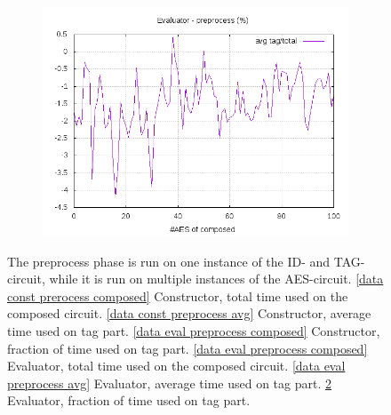 \documentclass[10pt,a4paper]{article}
\begin{document}
\begin{figure}[h]
\begin{subfigure}[t]{0.3\textwidth}
        \includegraphics[width=\textwidth]{eval_preprocess_frac}
        \caption{}
        \label{data eval preprocess frac}
    \end{subfigure}
    \caption{The preprocess phase is run on one instance of the ID- and TAG-circuit, while it is run on multiple instances of the AES-circuit. \ref{data const prerocess composed} Constructor, total time used on the composed circuit. \ref{data const preprocess avg} Constructor, average time used on tag part. \ref{data eval preprocess composed} Constructor, fraction of time used on tag part. \ref{data eval preprocess composed} Evaluator, total time used on the composed circuit. \ref{data eval preprocess avg} Evaluator, average time used on tag part. \ref{data eval preprocess frac} Evaluator, fraction of time used on tag part.}
\end{figure}
\end{document}
